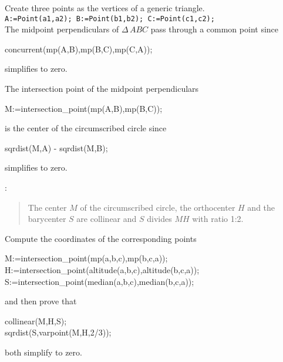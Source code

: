 Create three points as the vertices of a generic triangle. \\
{\tt A:=Point(a1,a2); B:=Point(b1,b2); C:=Point(c1,c2);} \\

\noindent The midpoint perpendiculars of $\Delta\,ABC$ pass through
a common point since
\begin{code}\+\>
concurrent(mp(A,B),mp(B,C),mp(C,A));
\end{code}
simplifies to zero.
\medskip


\example

\noindent The intersection point of the midpoint perpendiculars
\begin{code}\+\>
M:=intersection\_point(mp(A,B),mp(B,C));
\end{code}
is the center of the circumscribed circle since
\begin{code}\+\>
sqrdist(M,A) - sqrdist(M,B);	
\end{code}
simplifies to zero.
\medskip


\example

: 
\begin{quote}
The center $M$ of the circumscribed circle, the orthocenter $H$ and
the barycenter $S$ are collinear and $S$ divides $MH$ with ratio 1:2.
\end{quote}
Compute the coordinates of the corresponding points
\begin{code}\+\>
M:=intersection\_point(mp(a,b,c),mp(b,c,a));\\
H:=intersection\_point(altitude(a,b,c),altitude(b,c,a));\\
S:=intersection\_point(median(a,b,c),median(b,c,a));
\end{code}
and then prove that
\begin{code}\+\>
		collinear(M,H,S);\\
                sqrdist(S,varpoint(M,H,2/3));
\end{code}
both simplify to zero.
\medskip
